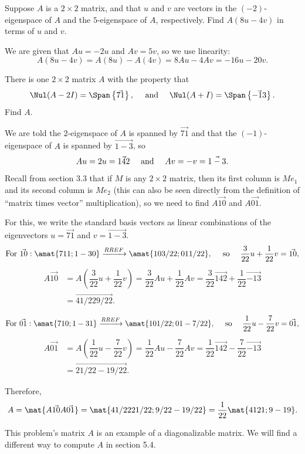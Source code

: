 \begin{problems}
\problem %
Suppose $A$ is a $2 \times 2$ matrix, and that $u$ and $v$ are vectors
in the $(-2)$-eigenspace of $A$ and the $5$-eigenspace of $A$, respectively.
Find $A(8u - 4v)$ in terms of $u$ and $v$.

\begin{solution}
We are given that $Au = -2u$ and $Av = 5v$, so we use linearity:
\[A(8u-4v) = A(8u) - A(4v) = 8Au - 4Av = -16u -20v.\]
\end{solution}

\problem %
There is one $2 \times 2$ matrix $A$ with the property that
\[\Nul(A-2I) = \Span \left\{\vec{7 1}\right\},
  \quad \textup{ and } \quad
  \Nul(A+I) = \Span \left\{\vec{-1 3} \right\}.\]
Find $A$.

\begin{solution}
  We are told the $2$-eigenspace of $A$ is spanned by $\vec{7 1}$ and that the
  $(-1)$-eigenspace of $A$ is spanned by $\vec{1 -3}$, so
  \[Au = 2u = \vec{14 2} \quad \textup{ and } \quad
  Av = -v = \vec{1 -3}.\]
  Recall from section 3.3 that if $M$ is any $2 \times 2$ matrix, then its first
  column is $Me_1$ and its second column is $Me_2$ (this can also
  be seen directly from the definition of ``matrix times vector'' multiplication), so
  we need to find $A\vec{1 0}$ and $A \vec{0 1}$.

  For this, we write the standard basis vectors as linear combinations of the
  eigenvectors $u = \vec{7 1}$ and $v = \vec{1 -3}$. %
  \[\textup{For } \vec{1 0}: \amat{7 1 1; 1 -3 0}
    \xrightarrow[]{RREF} \amat{1 0 3/22; 0 1 1/22},
    \quad \textup{ so } \quad \dfrac{3}{22}u + \dfrac{1}{22} v
    = \vec{1 0},\]
  \begin{align*}
    A \vec{1 0}
    & = A \left(\dfrac{3}{22}u + \dfrac{1}{22} v\right) 
      = \dfrac{3}{22} Au + \dfrac{1}{22} Av 
      = \dfrac{3}{22} \vec{14 2} + \dfrac{1}{22} \vec{-1 3} \\
    &  = \vec{41/22 9/22}.
  \end{align*}

  \[\textup{For } \vec{0 1}: \amat{7 1 0; 1 -3 1}
    \xrightarrow[]{RREF} \amat{1 0 1/22; 0 1 -7/22},
    \quad \textup{ so } \quad \dfrac{1}{22}u - \dfrac{7}{22} v
    = \vec{0 1},\]
  \begin{align*}
    A \vec{0 1}
    & = A \left(\dfrac{1}{22}u - \dfrac{7}{22} v\right) 
      = \dfrac{1}{22} Au - \dfrac{7}{22} Av 
      = \dfrac{1}{22} \vec{14 2} - \dfrac{7}{22} \vec{-1 3} \\
    &  = \vec{21/22 -19/22}.
  \end{align*}

Therefore,
\[A = \mat{A\vec{1 0} A\vec{0 1}} = \mat{41/22 21/22; 9/22 -19/22}
  = \dfrac{1}{22} \mat{41 21; 9 -19}.\]

This problem's matrix $A$ is an example of a diagonalizable matrix.  We will
find a different way to compute $A$ in section 5.4.
\end{solution}




\end{problems}\setcounter{problem}{0}

